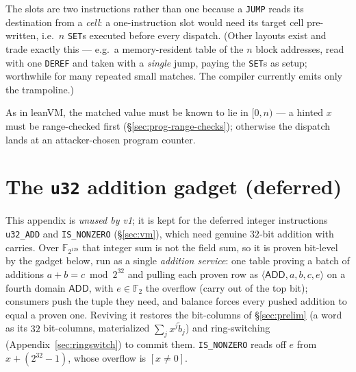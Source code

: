 \documentclass[11pt]{article}
\newcommand{\F}{\mathbb{F}}
\newcommand{\tup}[1]{\langle #1 \rangle}
\newcommand{\dsep}[1]{\mathsf{#1}}
\begin{document}
The slots are two instructions rather than one because a \texttt{JUMP} reads its destination from a \emph{cell}: a one-instruction slot would need its target cell pre-written, i.e.\ $n$ \texttt{SET}s executed before every dispatch. (Other layouts exist and trade exactly this — e.g.\ a memory-resident table of the $n$ block addresses, read with one \texttt{DEREF} and taken with a \emph{single} jump, paying the \texttt{SET}s as setup; worthwhile for many repeated small matches. The compiler currently emits only the trampoline.)

As in leanVM, the matched value must be known to lie in $[0,n)$ — a hinted $x$ must be range-checked first (\S\ref{sec:prog-range-checks}); otherwise the dispatch lands at an attacker-chosen program counter.

\iffalse %
\appendix

\section{The \texttt{u32} addition gadget (deferred)}\label{sec:add}

This appendix is \emph{unused by v1}; it is kept for the deferred integer instructions \texttt{u32\_ADD} and \texttt{IS\_NONZERO} (\S\ref{sec:vm}), which need genuine $32$-bit addition with carries. Over $\F_{2^{128}}$ that integer sum is not the field sum, so it is proven bit-level by the gadget below, run as a single \emph{addition service}: one table proving a batch of additions $a+b=c\bmod2^{32}$ and pulling each proven row as $\tup{\dsep{ADD},a,b,c,e}$ on a fourth domain $\dsep{ADD}$, with $e\in\F_2$ the overflow (carry out of the top bit); consumers push the tuple they need, and balance forces every pushed addition to equal a proven one. Reviving it restores the bit-columns of \S\ref{sec:prelim} (a word as its $32$ bit-columns, materialized $\sum_j x^j\widetilde b_j$) and ring-switching (Appendix~\ref{sec:ringswitch}) to commit them. \texttt{IS\_NONZERO} reads off $e$ from $x+(2^{32}{-}1)$, whose overflow is $[x\neq0]$.
\end{document}

